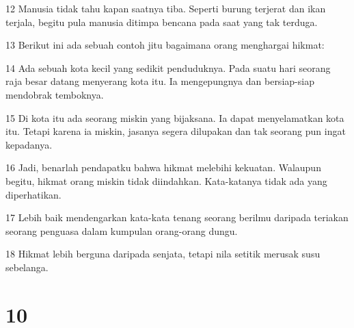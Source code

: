 \par 12 Manusia tidak tahu kapan saatnya tiba. Seperti burung terjerat dan ikan terjala, begitu pula manusia ditimpa bencana pada saat yang tak terduga.
\par 13 Berikut ini ada sebuah contoh jitu bagaimana orang menghargai hikmat:
\par 14 Ada sebuah kota kecil yang sedikit penduduknya. Pada suatu hari seorang raja besar datang menyerang kota itu. Ia mengepungnya dan bersiap-siap mendobrak temboknya.
\par 15 Di kota itu ada seorang miskin yang bijaksana. Ia dapat menyelamatkan kota itu. Tetapi karena ia miskin, jasanya segera dilupakan dan tak seorang pun ingat kepadanya.
\par 16 Jadi, benarlah pendapatku bahwa hikmat melebihi kekuatan. Walaupun begitu, hikmat orang miskin tidak diindahkan. Kata-katanya tidak ada yang diperhatikan.
\par 17 Lebih baik mendengarkan kata-kata tenang seorang berilmu daripada teriakan seorang penguasa dalam kumpulan orang-orang dungu.
\par 18 Hikmat lebih berguna daripada senjata, tetapi nila setitik merusak susu sebelanga.

\chapter{10}

